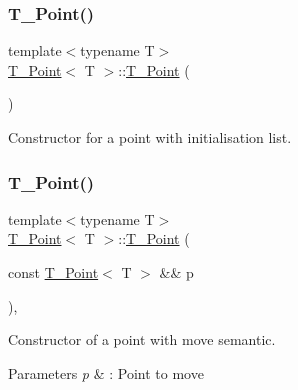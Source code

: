 \mbox{\label{classT__Point_a61017b12d3c2aa88a242dbbc57733413}} 
\subsubsection{\texorpdfstring{T\+\_\+\+Point()}{T\_Point()}\hspace{0.1cm}{\footnotesize\ttfamily [5/7]}}
{\footnotesize\ttfamily template$<$typename T$>$ \\
\hyperlink{classT__Point}{T\+\_\+\+Point}$<$ T $>$\+::\hyperlink{classT__Point}{T\+\_\+\+Point} (\begin{DoxyParamCaption}{ }\end{DoxyParamCaption})\hspace{0.3cm}{\ttfamily [inline]}}



Constructor for a point with initialisation list. 

\mbox{\label{classT__Point_af6c471d7e5547576a6c379930b9d1d35}} 
\subsubsection{\texorpdfstring{T\+\_\+\+Point()}{T\_Point()}\hspace{0.1cm}{\footnotesize\ttfamily [6/7]}}
{\footnotesize\ttfamily template$<$typename T$>$ \\
\hyperlink{classT__Point}{T\+\_\+\+Point}$<$ T $>$\+::\hyperlink{classT__Point}{T\+\_\+\+Point} (\begin{DoxyParamCaption}\item[{const \hyperlink{classT__Point}{T\+\_\+\+Point}$<$ T $>$ \&\&}]{p }\end{DoxyParamCaption})\hspace{0.3cm}{\ttfamily [inline]}, {\ttfamily [noexcept]}}



Constructor of a point with move semantic. 


\begin{DoxyParams}{Parameters}
{\em p} & \+: Point to move \\
\hline
\end{DoxyParams}
\mbox{\label{classT__Point_a12f2ef3c5f10e162dcb6385bbfbfae58}} 
